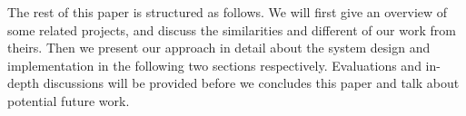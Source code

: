 The rest of this paper is structured as follows. We will first give an overview of some related projects, and discuss the similarities and different of our work from theirs. Then we present our approach in detail about the system design and implementation in the following two sections respectively. Evaluations and in-depth discussions will be provided before we concludes this paper and talk about potential future work.



